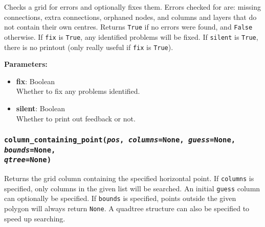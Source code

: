 Checks a grid for errors and optionally fixes them.  Errors checked for are: missing connections, extra connections, orphaned nodes, and columns and layers that do not contain their own centres.  Returns \texttt{True} if no errors were found, and \texttt{False} otherwise.  If \texttt{fix} is \texttt{True}, any identified problems will be fixed.  If \texttt{silent} is \texttt{True}, there is no printout (only really useful if \texttt{fix} is \texttt{True}).

\textbf{Parameters:}
\begin{itemize}
\item \textbf{fix}: Boolean\\
  Whether to fix any problems identified.
\item \textbf{silent}: Boolean\\
  Whether to print out feedback or not.
\end{itemize}

\subsubsection{\texttt{column\_containing\_point(\emph{pos}, \emph{columns}=None, \emph{guess}=None, \emph{bounds}=None,\\
\emph{qtree}=None)}}

Returns the grid column containing the specified horizontal point.  If \texttt{columns} is specified, only columns in the given list will be searched.  An initial \texttt{guess} column can optionally be specified.  If \texttt{bounds} is specified, points outside the given polygon will always return \texttt{None}.  A quadtree structure can also be specified to speed up searching.

